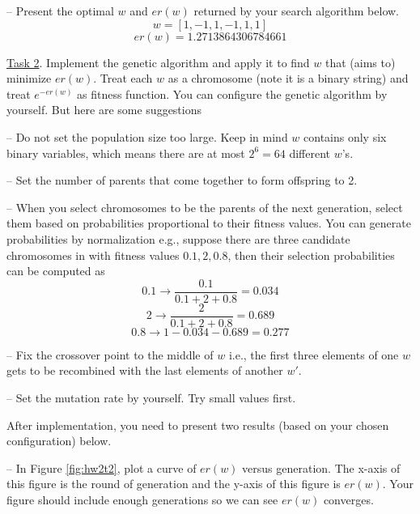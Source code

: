 \documentclass[a4paper, 11pt]{article}
\begin{document}
-- Present the optimal $w$ and $er(w)$ returned by your search algorithm below. 
\begin{equation}
\label{eq:t1w}
w = [1, -1, 1, -1, 1, 1]
\end{equation}
\begin{equation}
\label{eq:t1er}
er(w) = 1.2713864306784661
\end{equation}

\vspace{10pt}

\underline{Task 2}. Implement the genetic algorithm 
and apply it to find $w$ that (aims to) minimize 
$er(w)$. Treat each $w$ as a chromosome (note it 
is a binary string) and treat $e^{-er(w)}$ as  
fitness function. You can configure the genetic algorithm 
by yourself. But here are some suggestions

-- Do not set the population size too large. 
Keep in mind $w$ contains only six binary 
variables, which means there are at most  
$2^6 = 64$ different $w$'s. 

-- Set the number of parents that come together to form
offspring to 2. 

-- When you select chromosomes to be the parents 
of the next generation, 
select them based on probabilities proportional 
to their fitness values. You can generate probabilities 
by normalization e.g., suppose there are three candidate 
chromosomes in with fitness values $0.1, 2, 0.8$, then 
their selection probabilities can be computed as  
\begin{equation}
0.1 \rightarrow \frac{0.1}{0.1+2+0.8} = 0.034    
\end{equation}
\begin{equation}
2 \rightarrow \frac{2}{0.1+2+0.8} = 0.689  
\end{equation}
\begin{equation}
0.8 \rightarrow 1 - 0.034 - 0.689 = 0.277
\end{equation}

-- Fix the crossover point to the middle of 
$w$ i.e., the first three elements of one $w$ 
gets to be recombined with the last elements 
of another $w'$. 

-- Set the mutation rate by yourself. Try small 
values first. 

After implementation, you need to present two results 
(based on your chosen configuration) below. 

-- In Figure \ref{fig:hw2t2}, plot a curve of 
$er(w)$ versus generation. 
The x-axis of this figure is the round of 
generation and the y-axis of this figure is $er(w)$. Your figure should include enough generations so we 
can see $er(w)$ converges. 
\end{document}
